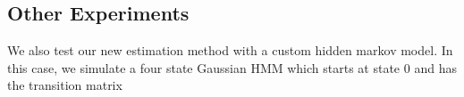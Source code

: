 \documentclass[english]{article}
\numberwithin{equation}{section}
\begin{document}
%	
%	
%	
%	
%	
%	
%	

	\subsection*{Other Experiments}
	We also test our new estimation method with a custom hidden markov model. In this case, we simulate a four state Gaussian HMM which starts at state $0$ and has the transition matrix
	
\end{document}
